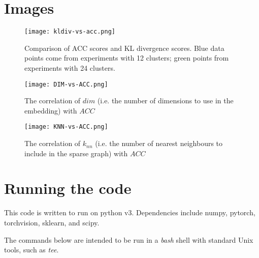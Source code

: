 \documentclass{article}
\begin{document}



\appendix

\section{Images}

\begin{figure}[H]
    \centering
    \texttt{[image: kldiv-vs-acc.png]}
    \caption{Comparison of ACC scores and KL divergence scores. Blue data points come from experiments with 12 clusters; green points from experiments with 24 clusters.}
\label{kld_vs_acc}
\end{figure}

\begin{figure}[H]
    \centering
    \texttt{[image: DIM-vs-ACC.png]}
    \caption{The correlation of $dim$ (i.e. the number of dimensions to use in the embedding) with $ACC$}
    \label{fig:acc_v_dim}
\end{figure}

\begin{figure}[H]
    \centering
    \texttt{[image: KNN-vs-ACC.png]}
    \caption{The correlation of $k_{nn}$ (i.e. the number of nearest neighbours to include in the sparse graph) with $ACC$}
    \label{fig:acc_v_knn}
\end{figure}

\section{Running the code}

This code is written to run on python v3. Dependencies include numpy, pytorch, torchvision, sklearn, and scipy.

The commands below are intended to be run in a  \textit{bash} shell with standard Unix tools, such as \textit{tee}.
\end{document}

